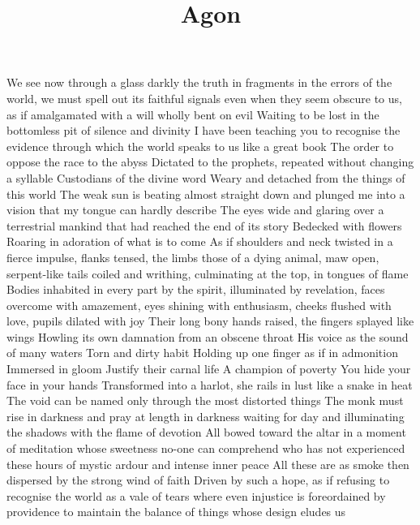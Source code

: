\documentclass{article}
\title{Agon}
\newenvironment{stanza}{\begin{minipage}{10cm}\obeylines}{\end{minipage}\vspace{\baselineskip}}
\begin{document}
\maketitle

\clearpage


\begin{stanza}
\end{stanza}

\iffalse
We see now through a glass darkly the truth in fragments in the errors of the world, we must spell out its faithful signals even when they seem obscure to us, as if amalgamated with a will wholly bent on evil
Waiting to be lost in the bottomless pit of silence and divinity
I have been teaching you to recognise the evidence through which the world speaks to us like a great book
The order to oppose the race to the abyss
Dictated to the prophets, repeated without changing a syllable
Custodians of the divine word
Weary and detached from the things of this world
The weak sun is beating almost straight down and plunged me into a vision that my tongue can hardly describe
The eyes wide and glaring over a terrestrial mankind that had reached the end of its story
Bedecked with flowers
Roaring in adoration of what is to come
As if shoulders and neck twisted in a fierce impulse, flanks tensed, the limbs those of a dying animal, maw open, serpent-like tails coiled and writhing, culminating at the top, in tongues of flame
Bodies inhabited in every part by the spirit, illuminated by revelation, faces overcome with amazement, eyes shining with enthusiasm, cheeks flushed with love, pupils dilated with joy
Their long bony hands raised, the fingers splayed like wings
Howling its own damnation from an obscene throat
His voice as the sound of many waters
Torn and dirty habit
Holding up one finger as if in admonition
Immersed in gloom
Justify their carnal life
A champion of poverty
You hide your face in your hands
Transformed into a harlot, she rails in lust like a snake in heat
The void can be named only through the most distorted things
The monk must rise in darkness and pray at length in darkness waiting for day and illuminating the shadows with the flame of devotion
All bowed toward the altar in a moment of meditation whose sweetness no-one can comprehend who has not experienced these hours of mystic ardour and intense inner peace
All these are as smoke then dispersed by the strong wind of faith
Driven by such a hope, as if refusing to recognise the world as a vale of tears where even injustice is foreordained by providence to maintain the balance of things whose design eludes us
\end{document}
